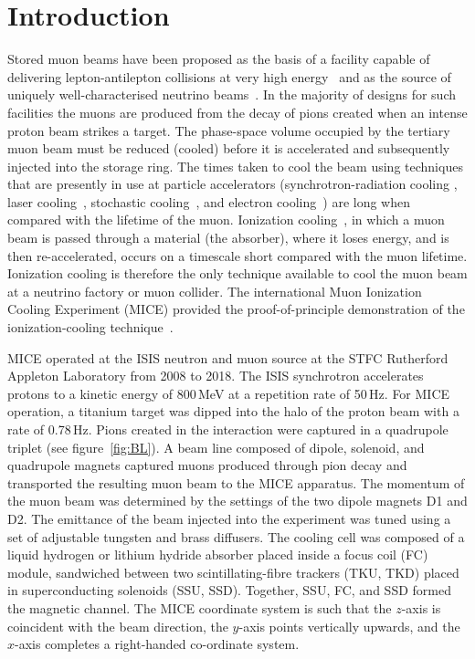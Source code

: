 \section{Introduction}
\label{Sect:Intro}

Stored muon beams have been proposed as the basis of a facility
capable of delivering lepton-antilepton collisions at very high
energy~\cite{Neuffer:1994bt,Palmer:2014nza} and as the source of
uniquely well-characterised neutrino 
beams~\cite{Geer:1998PhRvD..57.6989G,Bandyopadhyay:2007kx,Apollonio:2002en}.
In the majority of designs for such facilities the muons are produced
from the decay of pions created when an intense proton beam strikes a
target.
The phase-space volume occupied by the tertiary muon beam must be
reduced (cooled) before it is accelerated and subsequently injected
into the storage ring.
The times taken to cool the beam using techniques that are presently in
use at particle accelerators (synchrotron-radiation cooling
\cite{2012acph.book.....L}, laser
cooling~\cite{PhysRevLett.64.2901,PhysRevLett.67.1238,doi:10.1063/1.329218},
stochastic cooling~\cite{Marriner:2003mn}, and electron
cooling~\cite{1063-7869-43-5-R01}) are long when compared with the
lifetime of the muon.
Ionization cooling~\cite{cooling_methods,Neuffer:1983jr}, in which a
muon beam is passed through a material (the absorber), where it
loses energy, and is then re-accelerated, occurs on a timescale short
compared with the muon lifetime.
Ionization cooling is therefore the only technique available to cool the muon beam at a neutrino factory or muon collider.
The international Muon Ionization Cooling Experiment (MICE)
provided the proof-of-principle demonstration of the
ionization-cooling technique~\cite{Bogomilov:2019kfj}.

MICE operated at the ISIS neutron and muon source at the STFC
Rutherford Appleton Laboratory from 2008 to 2018.  
The ISIS synchrotron accelerates protons to a kinetic energy of 800\,MeV at a repetition rate of
50\,Hz.
For MICE operation, a titanium target was dipped
into the halo of the proton beam with a rate of 0.78\,Hz. 
Pions created in the interaction were captured in a quadrupole triplet
(see figure~\ref{fig:BL}).
A beam line composed of dipole, solenoid, and quadrupole
magnets captured muons produced through pion decay and transported the
resulting muon beam to the MICE apparatus.
The momentum of the muon beam was determined by the settings of the two dipole magnets D1 and D2.
The emittance of the beam injected into the experiment was tuned using
a set of adjustable tungsten and brass diffusers.
The cooling cell was composed of a liquid hydrogen or lithium hydride
absorber placed inside a focus coil (FC) module, sandwiched between
two scintillating-fibre trackers (TKU, TKD) placed in superconducting
solenoids (SSU, SSD).
Together, SSU, FC, and SSD formed the magnetic channel.
The MICE coordinate system is such that the $z$-axis is coincident
with the beam direction, the $y$-axis points vertically upwards, and the
$x$-axis completes a right-handed co-ordinate system.

